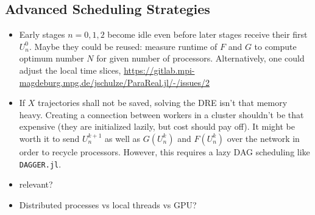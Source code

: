 \subsection{Advanced Scheduling Strategies}

\begin{itemize}
  \item
    Early stages $n=0,1,2$ become idle even before later stages receive their first $U^0_n$.
    Maybe they could be reused: measure runtime of $F$ and $G$ to compute optimum number $N$ for given number of processors.
    Alternatively, one could adjust the local time slices, \cf \url{https://gitlab.mpi-magdeburg.mpg.de/jschulze/ParaReal.jl/-/issues/2}
  \item
    If $X$ trajectories shall not be saved, solving the \ac{DRE} isn't that memory heavy.
    Creating a connection between workers in a cluster shouldn't be that expensive (they are initialized lazily, but cost should pay off).
    It might be worth it to send $U^{k+1}_n$ as well as $G(U^k_n)$ and $F(U^k_n)$ over the network in order to recycle processors.
    However, this requires a lazy DAG scheduling like \texttt{DAGGER.jl}.
  \item
    \cite[493]{Nielsen2018} relevant?
  \item
    Distributed processes vs local threads vs GPU?
\end{itemize}

